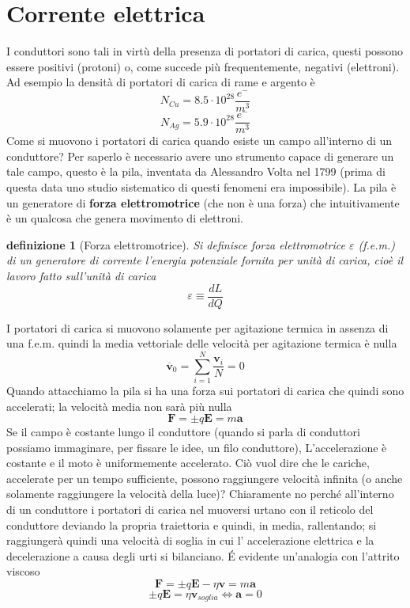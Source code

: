 \documentclass[10pt,a4paper]{article}
\newtheorem{definizione}{definizione}
\begin{document}
\section{Corrente elettrica}
I conduttori sono tali in virtù della presenza di portatori di carica, questi possono essere positivi (protoni) o, come succede più frequentemente, negativi (elettroni). Ad esempio la densità di portatori di carica di rame e argento è
\[N_{Cu} = 8.5 \cdot 10^{28}\frac{e^-}{m^3}\]
\[N_{Ag} = 5.9\cdot 10^{28}\frac{e^-}{m^3}\]
Come si muovono i portatori di carica quando esiste un campo all'interno di un conduttore? Per saperlo è necessario avere uno strumento capace di generare un tale campo, questo è la pila, inventata da Alessandro Volta nel 1799 (prima di questa data uno studio sistematico di questi fenomeni era impossibile). La pila è un generatore di \textbf{forza elettromotrice} (che non è una forza) che intuitivamente è un qualcosa che genera movimento di elettroni.
\begin{definizione}[Forza elettromotrice]
	Si definisce forza elettromotrice \(\varepsilon\) (f.e.m.) di un generatore di corrente l'energia potenziale fornita per unità di carica, cioè il lavoro fatto sull'unità di carica
	\[\varepsilon \equiv \frac{dL}{dQ}\]
\end{definizione}
I portatori di carica si muovono solamente per agitazione termica in assenza di una f.e.m. quindi la media vettoriale delle velocità per agitazione termica è nulla
\[\mathbf{\overline{v}}_0= \sum_{i = 1}^{N}\frac{\mathbf{v}_i}{N}=0\]
Quando attacchiamo la pila si ha una forza sui portatori di carica che quindi sono accelerati; la velocità media non sarà più nulla
\[\mathbf{F}= \pm q\mathbf{E}= m \mathbf{a}\]
Se il campo è costante lungo il conduttore (quando si parla di conduttori possiamo immaginare, per fissare le idee, un filo conduttore), L'accelerazione è costante e il moto è uniformemente accelerato. Ciò vuol dire che le cariche, accelerate per un tempo sufficiente, possono raggiungere velocità infinita (o anche solamente raggiungere la velocità della luce)? Chiaramente no perché all'interno di un conduttore i portatori di carica nel muoversi urtano con il reticolo del conduttore deviando la propria traiettoria e quindi, in media, rallentando; si raggiungerà quindi una velocità di soglia in cui l' accelerazione elettrica e la decelerazione a causa degli urti si bilanciano. \'E evidente un'analogia con l'attrito viscoso
\[\mathbf{F} = \pm q\mathbf{E}-\eta\mathbf{v}=m\mathbf{a}\]
\[\pm q\mathbf{E}=\eta\mathbf{v}_{soglia} \Leftrightarrow \mathbf{a}= 0\]
\end{document}
